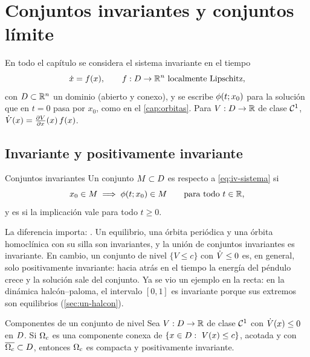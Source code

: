 \section{Conjuntos invariantes y conjuntos límite}
\label{sec:iv-invariantes}

En todo el capítulo se considera el sistema invariante en el tiempo
\begin{equation}
  \dot x=f(x),\qquad f:\D\to\R^n\ \text{localmente Lipschitz},
  \label{eq:iv-sistema}
\end{equation}
con $D\subset\mathbb{R}^n$ un dominio (abierto y conexo), y se escribe $\phi(t;x_0)$ para la solución que en $t=0$ pasa por $x_0$, como en el \cref{cap:orbitas}. Para $V:D\to\mathbb{R}$ de clase $\mathcal{C}^{1}$, $\dot V(x)=\frac{\partial V}{\partial x}(x)\,f(x)$.

\subsection{Invariante y positivamente invariante}

\begin{definicion}[label=def:iv-invariante]{Conjuntos invariantes \citep[\S4.2]{Kha02}}
Un conjunto $M\subset D$ es  respecto a \eqref{eq:iv-sistema} si
\[
  x_0\in M\;\Longrightarrow\;\phi(t;x_0)\in M\qquad\text{para todo }t\in\mathbb{R} ,
\]
y es  si la implicación vale para todo $t\ge0$.
\end{definicion}

La diferencia importa: . Un equilibrio, una órbita periódica y una órbita homoclínica con su silla son invariantes, y la unión de conjuntos invariantes es invariante. En cambio, un conjunto de nivel $\{V\le c\}$ con $\dot V\le0$ es, en general, solo positivamente invariante: hacia atrás en el tiempo la energía del péndulo crece y la solución sale del conjunto. Ya se vio un ejemplo en la recta: en la dinámica halcón--paloma, el intervalo $[0,1]$ es invariante porque sus extremos son equilibrios (\cref{sec:un-halcon}).

\begin{lema}[label=lem:iv-subnivel]{Componentes de un conjunto de nivel}
Sea $V:D\to\mathbb{R}$ de clase $\mathcal{C}^{1}$ con $\dot V(x)\le0$ en $D$. Si $\Omega_{c}$ es una componente conexa de $\{x\in D:\ V(x)\le c\}$, acotada y con $\overline{\Omega_{c}}\subset D$, entonces $\Omega_{c}$ es compacta y positivamente invariante.
\end{lema}

